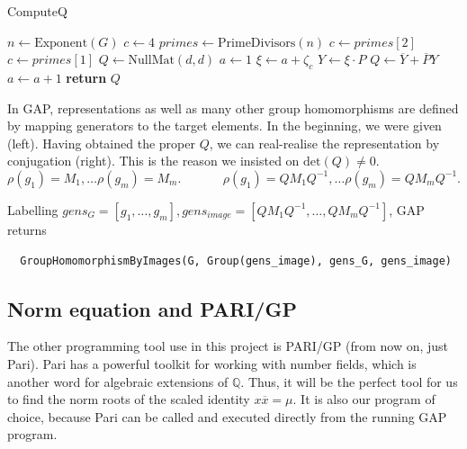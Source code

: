 \documentclass[11pt]{article}
\begin{document}
\begin{algorithm}
  \caption{ComputeQ}
  \label{alg:comp_q}
  \begin{algorithmic}
    \State $n \gets \text{Exponent}(G)$
      \State $c \gets 4$
    \Else
      \State $primes \gets \text{PrimeDivisors}(n)$
        \State $c \gets primes[2]$
      \Else
        \State $c \gets primes[1]$
      \EndIf
    \EndIf
    \State $Q \gets \text{NullMat}(d, d)$
    \State $a \gets 1$
      \State $\xi \gets a + \zeta_c$
      \State $Y \gets \xi \cdot P$
      \State $Q \gets \overline{Y} + \overline{P}Y$
      \State $a \gets a+1$
    \EndWhile
    \State \textbf{return} $Q$\
  \end{algorithmic}
\end{algorithm}

In GAP, representations as well as many other group homomorphisms are defined by mapping generators
to the target elements. In the beginning, we were given (left). Having obtained the proper $Q$, we
can real-realise the representation by conjugation (right). This is the reason we insisted on $\text{det}(Q) \neq 0$.
\[\rho(g_1) = M_1, \ldots \rho(g_m) = M_m.~~~~~~~~~~~~~~~\rho(g_1) = QM_1Q^{-1}, \ldots \rho(g_m) = QM_mQ^{-1}.\]

Labelling $gens_G = \left[g_1,\ldots,g_m\right], gens_{image} = \left[QM_1Q^{-1}, \ldots, QM_mQ^{-1}\right]$, GAP returns
\begin{verbatim}
  GroupHomomorphismByImages(G, Group(gens_image), gens_G, gens_image)
\end{verbatim}
\newpage
\subsection{Norm equation and PARI/GP} \label{sec:pari}

The other programming tool use in this project is PARI/GP \cite{PARI2}
(from now on, just Pari). Pari has a powerful toolkit for working with number
fields, which is another word for algebraic extensions of $\mathbb{Q}$. Thus, it
will be the perfect tool for us to find the norm roots of the scaled identity
$x\overline{x}=\mu$. It is also our program of choice, because Pari can be called
and executed directly from the running GAP program.
\end{document}
